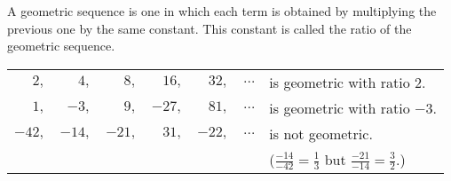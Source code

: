 \begin{frame}
\begin{definition}
A geometric sequence is one in which each term is obtained by multiplying the previous one by the same constant.  
This constant is called the ratio of the geometric sequence.  
\end{definition}

\begin{example}
\begin{tabular}{rrrrrcl}
$  2,$ & $  4,$ & $  8,$ & $ 16,$ & $ 32,$ & $\ldots$ & is geometric with ratio $2$. \\
$  1,$ & $ -3,$ & $  9,$ & $-27,$ & $ 81,$ & $\ldots$ & is geometric with ratio $-3$. \\
$-42,$ & $-14,$ & $-21,$ & $ 31,$ & $-22,$ & $\ldots$ & is not geometric. \\
& & & & & & ($\frac{-14}{-42} = \frac{1}{3}$ but $\frac{-21}{-14} = \frac{3}{2}$.)
\end{tabular}
\end{example}
\end{frame}
